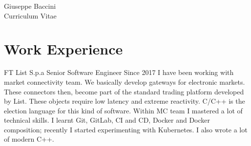 \documentclass[10pt]{article} %
\begin{document}
\begin{paracol}{2} %


\parbox[top][0.12\textheight][c]{\linewidth}{ %
	\vspace{-0.04\textheight} %
	\centering %
	{\sffamily\Huge Giuseppe Baccini}\\\medskip %
	{\Huge\color{headings}\cvtextfont Curriculum Vitae}
}


\section{Work Experience}





{FT} %
{List S.p.a} %
{Senior Software Engineer} %
{Since 2017 I have been working with market connectivity team. We basically develop gateways for electronic markets. These connectors then, become part of the standard trading platform developed by List. These objects require low latency and extreme reactivity. C/C++ is the election language for this kind of software. Within MC team I mastered a lot of technical skills. I learnt Git, GitLab, CI and CD, Docker and Docker composition; recently I started experimenting with Kubernetes. I also wrote a lot of modern C++. } %



\end{paracol}
\end{document}
